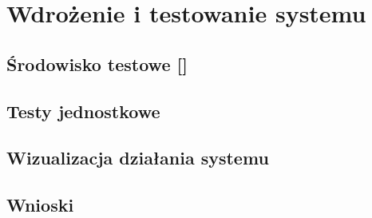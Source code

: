 \newpage\section{Wdrożenie i testowanie systemu \NazwaSys} \label{sec:testy}
\subsection[Środowisko testowe]{Środowisko testowe [\StudentA]}

\newpage
\subsection{Testy jednostkowe}

\newpage
\subsection{Wizualizacja działania systemu \textsl{\NazwaSys}}

\newpage
\subsection{Wnioski}
 
